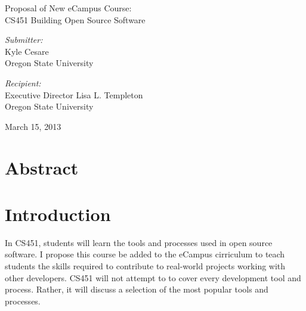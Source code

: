 \documentclass[12pt,letterpaper]{article}
\begin{document}
\begin{titlepage}
  \begin{center}
    {\LARGE Proposal of New eCampus Course:\\CS451 Building Open Source Software} \\[2cm]

    \begin{minipage}{0.4\textwidth}
      \begin{flushleft}
        \emph{Submitter:} \\
        Kyle Cesare \\
        Oregon State University \\
      \end{flushleft}
    \end{minipage}
    \begin{minipage}{0.4\textwidth}
      \begin{flushleft}
        \emph{Recipient:} \\
        Executive Director Lisa L. Templeton \\
        Oregon State University \\
      \end{flushleft}
    \end{minipage}

    \vfill

    March 15, 2013

  \end{center}
\end{titlepage}

\pagestyle{myheadings}
\setcounter{page}{2}

\setcounter{secnumdepth}{0}

\section{Abstract}

\pagebreak

\tableofcontents

\cleardoublepage
{}
\listoftables

\pagebreak


\section{Introduction}
In CS451, students will learn the tools and processes used in open source
software.  I propose this course be added to the eCampus cirriculum to teach
students the skills required to contribute to real-world projects working with
other developers.  CS451 will not attempt to to cover every development tool and
process.  Rather, it will discuss a selection of the most popular tools and
processes.
\end{document}
